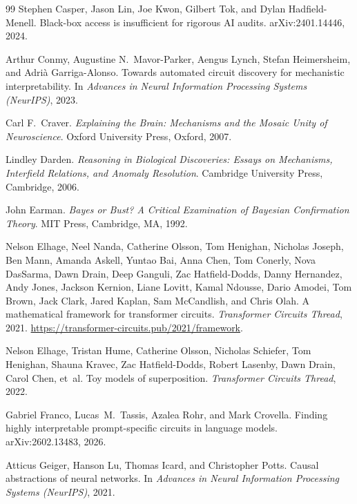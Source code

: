 \documentclass{article}
\begin{document}
\begin{thebibliography}{99}
Stephen Casper, Jason Lin, Joe Kwon, Gilbert Tok, and Dylan Hadfield-Menell.
\newblock Black-box access is insufficient for rigorous {AI} audits.
\newblock arXiv:2401.14446, 2024.

Arthur Conmy, Augustine N.\ Mavor-Parker, Aengus Lynch, Stefan Heimersheim,
  and Adri\`{a} Garriga-Alonso.
\newblock Towards automated circuit discovery for mechanistic interpretability.
\newblock In \emph{Advances in Neural Information Processing Systems (NeurIPS)}, 2023.

Carl F.\ Craver.
\newblock \emph{Explaining the Brain: Mechanisms and the Mosaic Unity of
  Neuroscience}.
\newblock Oxford University Press, Oxford, 2007.

Lindley Darden.
\newblock \emph{Reasoning in Biological Discoveries: Essays on Mechanisms,
  Interfield Relations, and Anomaly Resolution}.
\newblock Cambridge University Press, Cambridge, 2006.

John Earman.
\newblock \emph{Bayes or Bust? A Critical Examination of Bayesian Confirmation
  Theory}.
\newblock MIT Press, Cambridge, MA, 1992.

Nelson Elhage, Neel Nanda, Catherine Olsson, Tom Henighan, Nicholas Joseph,
  Ben Mann, Amanda Askell, Yuntao Bai, Anna Chen, Tom Conerly, Nova DasSarma,
  Dawn Drain, Deep Ganguli, Zac Hatfield-Dodds, Danny Hernandez, Andy Jones,
  Jackson Kernion, Liane Lovitt, Kamal Ndousse, Dario Amodei, Tom Brown, Jack
  Clark, Jared Kaplan, Sam McCandlish, and Chris Olah.
\newblock A mathematical framework for transformer circuits.
\newblock \emph{Transformer Circuits Thread}, 2021.
\newblock \url{https://transformer-circuits.pub/2021/framework}.

Nelson Elhage, Tristan Hume, Catherine Olsson, Nicholas Schiefer, Tom Henighan,
  Shauna Kravec, Zac Hatfield-Dodds, Robert Lasenby, Dawn Drain, Carol Chen,
  et~al.
\newblock Toy models of superposition.
\newblock \emph{Transformer Circuits Thread}, 2022.

Gabriel Franco, Lucas~M.\ Tassis, Azalea Rohr, and Mark Crovella.
\newblock Finding highly interpretable prompt-specific circuits in language
  models.
\newblock arXiv:2602.13483, 2026.

Atticus Geiger, Hanson Lu, Thomas Icard, and Christopher Potts.
\newblock Causal abstractions of neural networks.
\newblock In \emph{Advances in Neural Information Processing Systems
  (NeurIPS)}, 2021.


\end{thebibliography}
\end{document}
